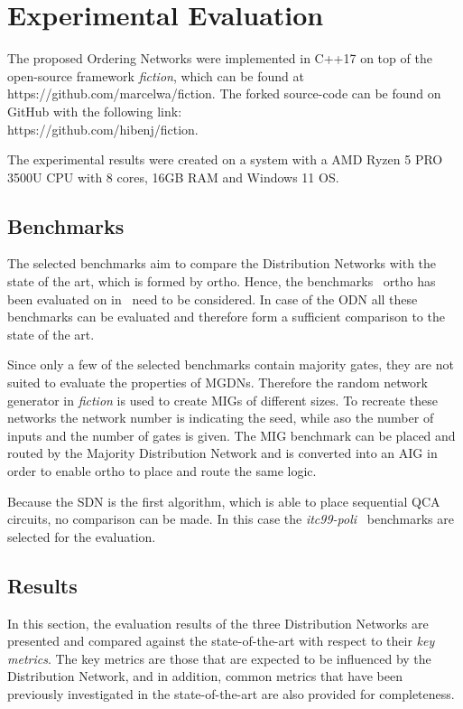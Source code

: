 \chapter{Experimental Evaluation}\label{chapter:ExpEval}

The proposed Ordering Networks were implemented in C++17 on top of the open-source framework \textit{fiction}, which can be found at https://github.com/marcelwa/fiction. The forked source-code can be found on GitHub with the following link: \\https://github.com/hibenj/fiction.

The experimental results were created on a system with a AMD Ryzen 5 PRO 3500U CPU with 8 cores, 16GB RAM and Windows 11 OS.

\section{Benchmarks}
The selected benchmarks aim to compare the Distribution Networks with the state of the art, which is formed by ortho. Hence, the benchmarks~\cite{fontes, trindade2016placement, epfl, iscas} ortho has been evaluated on in~\cite{ortho} need to be considered. In case of the ODN all these benchmarks can be evaluated and therefore form a sufficient comparison to the state of the art.

Since only a few of the selected benchmarks contain majority gates, they are not suited to evaluate the properties of MGDNs. Therefore the random network generator in \textit{fiction} is used to create MIGs of different sizes. To recreate these networks the network number is indicating the seed, while aso the number of inputs and the number of gates is given. The MIG benchmark can be placed and routed by the Majority Distribution Network and is converted into an AIG in order to enable ortho to place and route the same logic.

Because the SDN is the first algorithm, which is able to place sequential QCA circuits, no comparison can be made. In this case the \textit{itc99-poli}~\cite{itc_poli} benchmarks are selected for the evaluation.

\section{Results}
In this section, the evaluation results of the three Distribution Networks are presented and compared against the state-of-the-art with respect to their \textit{key metrics}. The key metrics are those that are expected to be influenced by the Distribution Network, and in addition, common metrics that have been previously investigated in the state-of-the-art are also provided for completeness.


